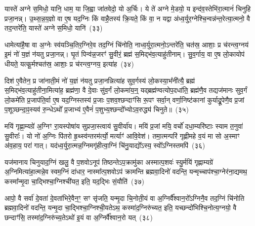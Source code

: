 {\anuvakamend[{आ॒गच्छा॒त्तद्व्या॑न॒शुस्तेने॒मं य॒ज्ञं नो॑ वह॒ सुव॑र्दे॒वेषु॒ गन्त॑वे॒ चतु॑र्दश च}]}

यास्ते॑ अग्ने स॒मिधो॒ यानि॒ धाम॒ या जि॒ह्वा जा॑तवेदो॒ यो अ॒र्चिः। ये ते॑ अग्ने मे॒डयो॒ य इन्द॑व॒स्तेभि॑रा॒त्मानं॑ चिनुहि प्रजा॒नन्न्। उ॒थ्स॒न्न॒य॒ज्ञो वा ए॒ष यद॒ग्निः किं वाहै॒तस्य॑ क्रि॒यते॒ किं वा॒ न यद्वा अ॑ध्व॒र्युर॒ग्नेश्चि॒न्वन्न॑न्त॒रेत्या॒त्मनो॒ वै तद॒न्तरे॑ति॒ यास्ते॑ अग्ने स॒मिधो॒ यानि॑~(३३)\ip

धामेत्या॑है॒षा वा अ॒ग्नेः स्व॑यञ्चि॒तिर॒ग्निरे॒व तद॒ग्निं चि॑नोति॒ नाध्व॒र्युरा॒त्मनो॒\-ऽन्तरे॑ति॒ चत॑स्र॒ आशाः॒ प्र च॑रन्त्व॒ग्नय॑ इ॒मं नो॑ य॒ज्ञं न॑यतु प्रजा॒नन्न्। घृ॒तं पिन्व॑न्न॒जरꣳ॑ सु॒वीरं॒ ब्रह्म॑ स॒मिद्भ॑व॒त्याहु॑तीनाम्। सु॒व॒र्गाय॒ वा ए॒ष लो॒कायोप॑ धीयते॒ यत्कू॒र्मश्चत॑स्र॒ आशाः॒ प्र च॑रन्त्व॒ग्नय॒ इत्या॑ह~(३४)\ip

दिश॑ ए॒वैतेन॒ प्र जा॑नाती॒मं नो॑ य॒ज्ञं न॑यतु प्रजा॒नन्नित्या॑ह सुव॒र्गस्य॑ लो॒कस्या॒भ᳚नी॑त्यै॒ ब्रह्म॑ स॒मिद्भ॑व॒त्याहु॑तीना॒मित्या॑ह॒ ब्रह्म॑णा॒ वै दे॒वाः सु॑व॒र्गं लो॒कमा॑य॒न्॒ यद्ब्रह्म॑ण्वत्योप॒दधा॑ति॒ ब्रह्म॑णै॒व तद्यज॑मानः सुव॒र्गं लो॒कमे॑ति प्र॒जा\-प॑ति॒र्वा ए॒ष यद॒ग्निस्तस्य॑ प्र॒जाः प॒शव॒श्छन्दाꣳ॑सि रू॒पꣳ सर्वा॒न् वर्णा॒निष्ट॑कानां कुर्याद्रू॒पेणै॒व प्र॒जां प॒शूञ्छन्दा॒ꣴ॒स्यव॑ रु॒न्धे\-ऽथो᳚ प्र॒जाभ्य॑ ए॒वैनं॑ प॒शुभ्य॒श्छन्दो᳚भ्यो\-ऽव॒रुद्ध्य॑ चिनुते॥~(३५)\ip

{\anuvakamend[{यान्य॒ग्नय॒ इत्या॒हेष्ट॑काना॒ꣳ॒ षोड॑श च}]}

मयि॑ गृह्णा॒म्यग्रे॑ अ॒ग्निꣳ रा॒यस्पोषा॑य सुप्रजा॒स्त्वाय॑ सु॒वीर्या॑य। मयि॑ प्र॒जां मयि॒ वर्चो॑ दधा॒म्यरि॑ष्टाः स्याम त॒नुवा॑ सु॒वीराः᳚। यो नो॑ अ॒ग्निः पि॑तरो हृ॒थ्स्व॑न्तरम॑र्त्यो॒ मर्त्याꣳ॑ आवि॒वेश॑। तमा॒त्मन्परि॑ गृह्णीमहे व॒यं मा सो अ॒स्माꣳ अ॑व॒हाय॒ परा॑ गात्। यद॑ध्व॒र्युरा॒त्मन्न॒ग्निमगृ॑हीत्वा॒ग्निं चि॑नु॒याद्यो᳚\-ऽस्य॒ स्वो᳚\-ऽग्निस्तमपि॑~(३६)\ip

यज॑मानाय चिनुयाद॒ग्निं खलु॒ वै प॒शवो\-ऽनूप॑ तिष्ठन्ते\-ऽप॒क्रामु॑का अस्मात्प॒शवः॑ स्यु॒र्मयि॑ गृह्णाम्यग्रे॑ अ॒ग्निमित्या॑हा॒त्मन्ने॒व स्वम॒ग्निं दा॑धार॒ नास्मा᳚त्प॒शवो\-ऽप॑ क्रामन्ति ब्रह्मवा॒दिनो॑ वदन्ति॒ यन्मृच्चाप॑श्चा॒ग्नेर॑ना॒द्यमथ॒ कस्मा᳚न्मृ॒दा चा॒द्भिश्चा॒ग्निश्ची॑यत॒ इति॒ यद॒द्भिः सं॒यौति॑~(३७)\ip

आपो॒ वै सर्वा॑ दे॒वता॑ दे॒वता॑भिरे॒वैन॒ꣳ॒ सꣳ सृ॑जति॒ यन्मृ॒दा चि॒नोती॒यं वा अ॒ग्निर्वै᳚श्वान॒रो᳚\-ऽग्निनै॒व तद॒ग्निं चि॑नोति ब्रह्मवा॒दिनो॑ वदन्ति॒ यन्मृ॒दा चा॒द्भिश्चा॒ग्निश्ची॒यते\-ऽथ॒ कस्मा॑द॒ग्निरु॑च्यत॒ इति॒ यच्छन्दो॑भिश्चि॒नोत्य॒ग्नयो॒ वै छन्दाꣳ॑सि॒ तस्मा॑द॒ग्निरु॑च्य॒ते\-ऽथो॑ इ॒यं वा अ॒ग्निर्वै᳚श्वान॒रो यत्~(३८)\ip


